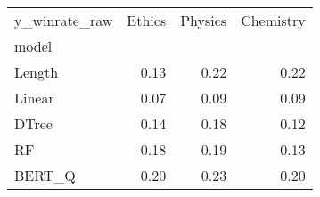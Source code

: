 \begin{tabular}{lrrr}
\toprule
y\_winrate\_raw &  Ethics &  Physics &  Chemistry \\
model  &         &          &            \\
\midrule
Length &    0.13 &     0.22 &       0.22 \\
Linear &    0.07 &     0.09 &       0.09 \\
DTree  &    0.14 &     0.18 &       0.12 \\
RF     &    0.18 &     0.19 &       0.13 \\
BERT\_Q &    0.20 &     0.23 &       0.20 \\
\bottomrule
\end{tabular}
